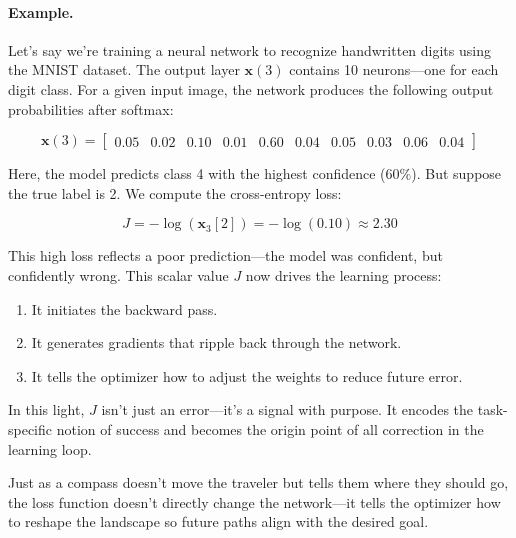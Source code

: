 \paragraph{Example.} Let’s say we’re training a neural network to recognize handwritten digits using the MNIST dataset. The output layer \(\mathbf{x}(3)\) contains 10 neurons—one for each digit class. For a given input image, the network produces the following output probabilities after softmax:

\[
\mathbf{x}(3) = 
\begin{bmatrix}
0.05 & 0.02 & 0.10 & 0.01 & \mathbf{0.60} & 0.04 & 0.05 & 0.03 & 0.06 & 0.04
\end{bmatrix}
\]

Here, the model predicts class 4 with the highest confidence (\(60\%\)). But suppose the true label is 2. We compute the cross-entropy loss:

\[
J = -\log(\mathbf{x}_3[2]) = -\log(0.10) \approx 2.30
\]

This high loss reflects a poor prediction—the model was confident, but confidently wrong. This scalar value \(J\) now drives the learning process:

\begin{enumerate}
	\item It initiates the backward pass.
	\item It generates gradients that ripple back through the network.
	\item It tells the optimizer how to adjust the weights to reduce future error.
\end{enumerate}

In this light, \(J\) isn’t just an error—it’s a signal with purpose. It encodes the task-specific notion of success and becomes the origin point of all correction in the learning loop.

Just as a compass doesn’t move the traveler but tells them where they should go, the loss function doesn’t directly change the network—it tells the optimizer how to reshape the landscape so future paths align with the desired goal.

